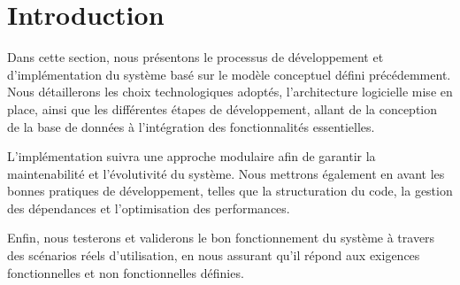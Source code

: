 \section{Introduction}
Dans cette section, nous présentons le processus de développement et d’implémentation du système basé sur le modèle conceptuel défini précédemment. Nous détaillerons les choix technologiques adoptés, l’architecture logicielle mise en place, ainsi que les différentes étapes de développement, allant de la conception de la base de données à l’intégration des fonctionnalités essentielles.

L’implémentation suivra une approche modulaire afin de garantir la maintenabilité et l’évolutivité du système. Nous mettrons également en avant les bonnes pratiques de développement, telles que la structuration du code, la gestion des dépendances et l’optimisation des performances.

Enfin, nous testerons et validerons le bon fonctionnement du système à travers des scénarios réels d’utilisation, en nous assurant qu’il répond aux exigences fonctionnelles et non fonctionnelles définies.
